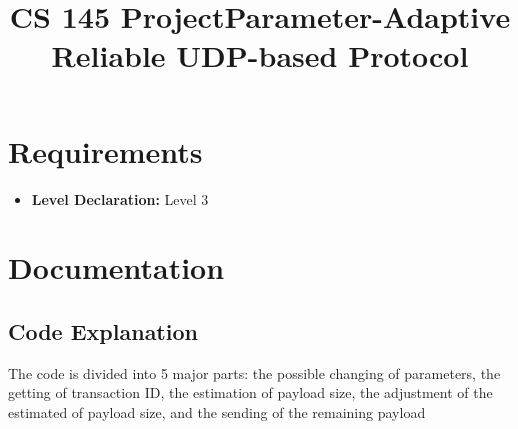 \documentclass[a4paper]{article} %
\title{CS 145 Project\:Parameter-Adaptive Reliable UDP-based
Protocol}
\author{}
\date{}
\begin{document}
    \maketitle
    \section{Requirements}
    \begin{itemize}
        \item \textbf{Level Declaration:} Level 3
    \end{itemize}
    \section{Documentation}
    \subsection{Code Explanation}
    The code is divided into 5 major parts: 
    the possible changing of parameters, 
    the getting of transaction ID,
    the estimation of payload size,
    the adjustment of the estimated of payload size, and
    the sending of the remaining payload
\end{document}
